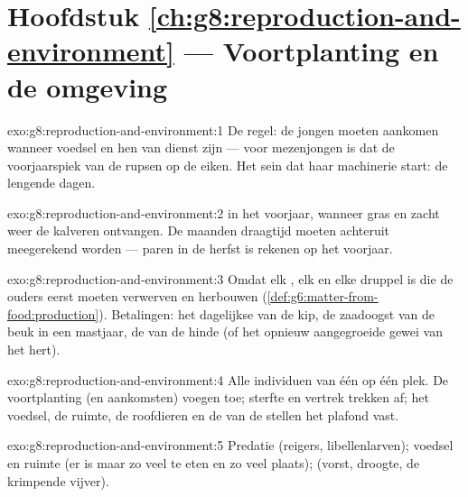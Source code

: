\section*{Hoofdstuk \ref{ch:g8:reproduction-and-environment} --- Voortplanting en de omgeving}

\begin{solution}{exo:g8:reproduction-and-environment:1}
De regel: de jongen moeten aankomen wanneer voedsel en  hen
van dienst zijn --- voor mezenjongen is dat de voorjaarspiek van de rupsen
op de eiken. Het sein dat haar machinerie start: de lengende dagen.
\end{solution}

\begin{solution}{exo:g8:reproduction-and-environment:2}
 in het voorjaar, wanneer gras en zacht weer de kalveren
ontvangen. De maanden draagtijd moeten achteruit meegerekend worden ---
paren in de herfst is rekenen op het voorjaar.
\end{solution}

\begin{solution}{exo:g8:reproduction-and-environment:3}
Omdat elk , elk  en elke druppel   is die de
ouders eerst moeten verwerven en herbouwen
(\cref{def:g6:matter-from-food:production}). Betalingen: het dagelijkse
 van de kip, de zaadoogst van de beuk in een mastjaar, de  van de
hinde (of het opnieuw aangegroeide gewei van het hert).
\end{solution}

\begin{solution}{exo:g8:reproduction-and-environment:4}
Alle individuen van één  op één plek. De voortplanting (en aankomsten)
voegen toe; sterfte en vertrek trekken af; het voedsel, de ruimte, de
roofdieren en de  van de  stellen het plafond vast.
\end{solution}

\begin{solution}{exo:g8:reproduction-and-environment:5}
Predatie (reigers, libellenlarven); voedsel en ruimte (er is maar zo veel
te eten en zo veel plaats);  (vorst, droogte, de krimpende
vijver).
\end{solution}

